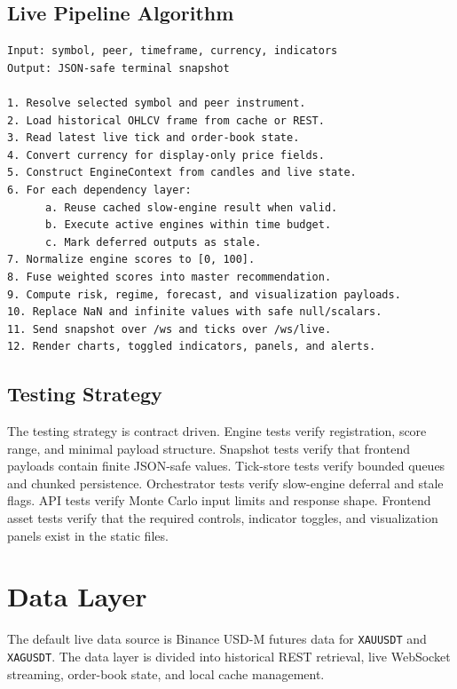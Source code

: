 \documentclass[conference]{IEEEtran}
\begin{document}
\subsection{Live Pipeline Algorithm}

\begin{lstlisting}[caption={Live bundle construction and rendering pipeline.},label={alg:live-pipeline}]
Input: symbol, peer, timeframe, currency, indicators
Output: JSON-safe terminal snapshot

1. Resolve selected symbol and peer instrument.
2. Load historical OHLCV frame from cache or REST.
3. Read latest live tick and order-book state.
4. Convert currency for display-only price fields.
5. Construct EngineContext from candles and live state.
6. For each dependency layer:
      a. Reuse cached slow-engine result when valid.
      b. Execute active engines within time budget.
      c. Mark deferred outputs as stale.
7. Normalize engine scores to [0, 100].
8. Fuse weighted scores into master recommendation.
9. Compute risk, regime, forecast, and visualization payloads.
10. Replace NaN and infinite values with safe null/scalars.
11. Send snapshot over /ws and ticks over /ws/live.
12. Render charts, toggled indicators, panels, and alerts.
\end{lstlisting}

\subsection{Testing Strategy}

The testing strategy is contract driven. Engine tests verify registration,
score range, and minimal payload structure. Snapshot tests verify that
frontend payloads contain finite JSON-safe values. Tick-store tests verify
bounded queues and chunked persistence. Orchestrator tests verify slow-engine
deferral and stale flags. API tests verify Monte Carlo input limits and
response shape. Frontend asset tests verify that the required controls,
indicator toggles, and visualization panels exist in the static files.

\section{Data Layer}

The default live data source is Binance USD-M futures data for
\texttt{XAUUSDT} and \texttt{XAGUSDT}. The data layer is divided into
historical REST retrieval, live WebSocket streaming, order-book state, and
local cache management.
\end{document}
